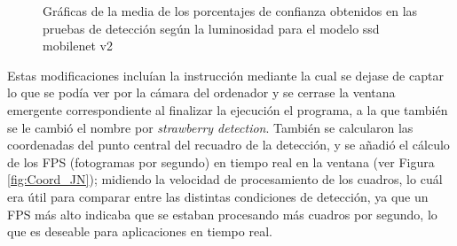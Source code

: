  \begin{figure}[H]
    \begin{center}
      \subcapcentertrue
      \hspace{4mm}
    \end{center}
    \caption{Gráficas de la media de los porcentajes de confianza obtenidos en las pruebas de detección según la luminosidad para el modelo ssd mobilenet v2}
    \label{fig:Grafica_medias_luminosidad}
  \end{figure}

Estas modificaciones incluían la instrucción mediante la cual se dejase de captar lo que se podía ver por la cámara del ordenador y se cerrase la ventana emergente correspondiente al finalizar la ejecución el programa, a la que también se le cambió el nombre por \textit{strawberry detection}. También se calcularon las coordenadas del punto central del recuadro de la detección, y se añadió el cálculo de los FPS (fotogramas por segundo) en tiempo real en la ventana (ver Figura \ref{fig:Coord_JN}); midiendo la velocidad de procesamiento de los cuadros, lo cuál era útil para comparar entre las distintas condiciones de detección, ya que un FPS más alto indicaba que se estaban procesando más cuadros por segundo, lo que es deseable para aplicaciones en tiempo real.

